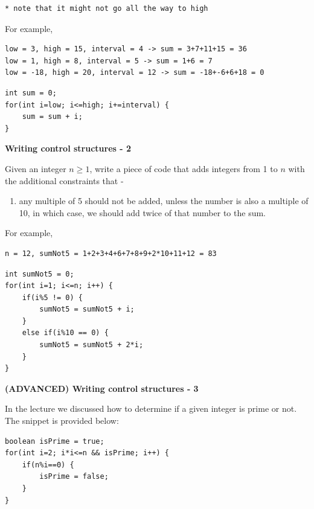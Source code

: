 \begin{questions}
\begin{verbatim}
* note that it might not go all the way to high
\end{verbatim}

For example, 
\begin{verbatim}
low = 3, high = 15, interval = 4 -> sum = 3+7+11+15 = 36
low = 1, high = 8, interval = 5 -> sum = 1+6 = 7
low = -18, high = 20, interval = 12 -> sum = -18+-6+6+18 = 0
\end{verbatim}

\begin{solution}
\begin{lstlisting}
int sum = 0;
for(int i=low; i<=high; i+=interval) {
	sum = sum + i;
}
\end{lstlisting}
\end{solution}

\question \textbf{Writing control structures - 2}

Given an integer $n \geq 1$, write a piece of code that adds  integers from 1 to $n$ with the additional constraints that -

\begin{enumerate}
  \item any multiple of 5 should not be added, unless the number is also a multiple of 10, in which case, we should add twice of that number to the sum.
\end{enumerate}

For example,

\begin{verbatim}
n = 12, sumNot5 = 1+2+3+4+6+7+8+9+2*10+11+12 = 83
\end{verbatim}

\begin{solution}
\begin{lstlisting}
int sumNot5 = 0;
for(int i=1; i<=n; i++) {
	if(i%5 != 0) {
		sumNot5 = sumNot5 + i;
	}
	else if(i%10 == 0) {
		sumNot5 = sumNot5 + 2*i;
	}
}
\end{lstlisting}
\end{solution}

\question \textbf{(ADVANCED) Writing control structures - 3}

In the lecture we discussed how to determine if a given integer is prime or not. The snippet is provided below:

\begin{lstlisting}
boolean isPrime = true;
for(int i=2; i*i<=n && isPrime; i++) {
	if(n%i==0) {
		isPrime = false;
	}
}
\end{lstlisting}


\end{questions}
